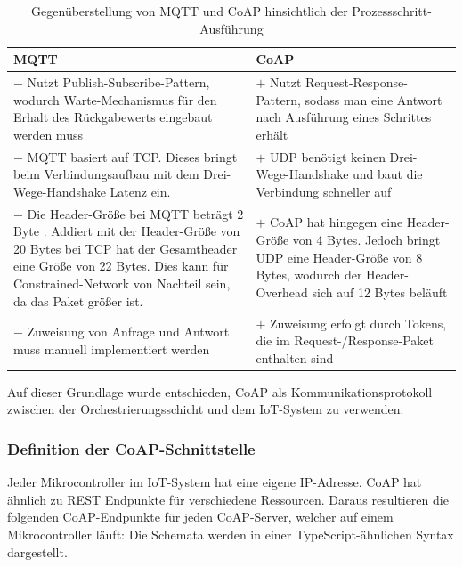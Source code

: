 \begin{table}[H]
\centering
\begin{tabularx}{\textwidth}{>{\raggedright\arraybackslash}X >{\raggedright\arraybackslash}X}
\toprule
\textbf{MQTT} & \textbf{CoAP} \\
\midrule
$-$ Nutzt Publish-Subscribe-Pattern, wodurch Warte-Mechanismus für den Erhalt des Rückgabewerts eingebaut werden muss \cite{al-fuqaha_internet_2015} & $+$ Nutzt Request-Response-Pattern, sodass man eine Antwort nach Ausführung eines Schrittes erhält \cite{al-fuqaha_internet_2015} \\
\addlinespace
$-$ MQTT basiert auf TCP. Dieses bringt beim Verbindungsaufbau mit dem Drei-Wege-Handshake Latenz ein. \cite{kurose_computernetzwerke_2014} & $+$ UDP benötigt keinen Drei-Wege-Handshake und baut die Verbindung schneller auf \cite{kurose_computernetzwerke_2014} \\
\addlinespace
$-$ Die Header-Größe bei MQTT beträgt 2 Byte \cite{noauthor_information_2016}. Addiert mit der Header-Größe von 20 Bytes bei TCP hat der Gesamtheader eine Größe von 22 Bytes. Dies kann für Constrained-Network von Nachteil sein, da das Paket größer ist. & $+$ CoAP hat hingegen eine Header-Größe von 4 Bytes. Jedoch bringt UDP eine Header-Größe von 8 Bytes, wodurch der Header-Overhead sich auf 12 Bytes beläuft \\
\addlinespace
$-$ Zuweisung von Anfrage und Antwort muss manuell implementiert werden & $+$ Zuweisung erfolgt durch Tokens, die im Request-/Response-Paket enthalten sind \cite{al-fuqaha_internet_2015} \\
\bottomrule
\end{tabularx}
\caption{Gegenüberstellung von MQTT und CoAP hinsichtlich der Prozessschritt-Ausführung}
\label{tab:mqtt-coap}
\end{table}

\noindent Auf dieser Grundlage wurde entschieden, CoAP als Kommunikationsprotokoll zwischen der Orchestrierungsschicht und dem IoT-System zu verwenden.

\subsubsection{Definition der CoAP-Schnittstelle}
\label{coap-interface}

Jeder Mikrocontroller im IoT-System hat eine eigene \ac{IP}-Adresse. CoAP hat ähnlich zu \ac{REST} Endpunkte für verschiedene Ressourcen.
Daraus resultieren die folgenden CoAP-Endpunkte für jeden CoAP-Server, welcher auf einem Mikrocontroller läuft:
Die Schemata werden in einer TypeScript-ähnlichen Syntax dargestellt.


